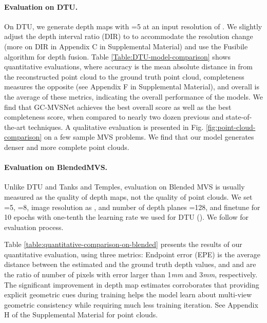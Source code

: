 \documentclass[10pt,twocolumn,letterpaper]{article}
\begin{document}
\paragraph{Evaluation on DTU.}
On DTU, we generate depth maps with =5 at an input
resolution of . We slightly adjust the depth interval ratio (DIR) to  to accommodate the resolution change (more on DIR in
Appendix C in Supplemental Material) and use the Fusibile algorithm \cite{Galliani2015fusibile} for
depth fusion.
Table \ref{Table:DTU-model-comparison} shows quantitative
evaluations, where accuracy is the mean
absolute distance in  from the reconstructed point cloud to the
ground truth point cloud, completeness measures the opposite
(see Appendix F in Supplemental Material), and overall is the average of
these metrics, indicating the overall performance of the
models. We find that GC-MVSNet achieves the best overall score as well as the best
completeness score, when compared to nearly two dozen previous and state-of-the-art techniques.
A qualitative evaluation is presented in Fig. \ref{fig:point-cloud-comparison} on a few
sample MVS problems.
We find that our model
generates denser and more complete point clouds.


\vspace{-10pt}
\paragraph{Evaluation on BlendedMVS.}
Unlike DTU and Tanks and Temples, evaluation on Blended MVS is usually measured
as the quality of depth maps, not the quality of point clouds.
We set =5, =8, image
resolution as , and number of depth planes =128, and
finetune for 10 epochs with one-tenth the learning rate we used for DTU ().
We follow \cite{darmon2021wildMVS} for evaluation process.

Table \ref{table:quantitative-comparison-on-blended} presents the results of 
our quantitative evaluation, using three metrics:
Endpoint error (EPE) is the average 
distance between the estimated and the ground truth depth values, and
 and  are the ratio of number of pixels with  error
larger than 1\textit{mm} and 3\textit{mm}, respectively.
The significant improvement in depth map estimates corroborates that providing explicit geometric cues during training
helps the model learn about multi-view geometric consistency while requiring much less training iteration. See Appendix H of the Supplemental Material for point clouds.
\end{document}
